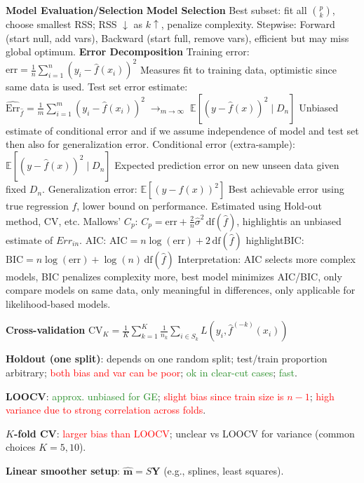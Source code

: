 \documentclass[9pt]{article}
\renewcommand\small{\footnotesize}
\newcommand{\toptopic}[1]{\textbf{{#1}}}
\newcommand{\highlight}[1]{\small{\textcolor{Sepia}{#1}}}
\newcommand{\topic}[1]{\small{\textbf{\textcolor{Sepia}{#1}}}}
\begin{document}
\begin{multicols*}{3}
\toptopic{Model Evaluation/Selection}
\topic{Model Selection} Best subset: fit all $\binom{p}{k}$, choose smallest RSS; RSS $\downarrow$ as $k \uparrow$, penalize complexity. Stepwise: Forward (start null, add vars), Backward (start full, remove vars), efficient but may miss global optimum. 
\topic{Error Decomposition}
\highlight{Training error}: $\text{err} = \tfrac{1}{n}\sum_{i=1}^n (y_i - \hat f(x_i))^2$  
Measures fit to training data, optimistic since same data is used.
\highlight{Test set error estimate}: $\hat{\text{Err}}_{\hat f} = \tfrac{1}{m}\sum_{i=1}^m (y_i - \hat f(x_i))^2 \;\to_{m\to\infty}\; \mathbb{E}[(y-\hat f(x))^2 \mid D_n]$ Unbiased estimate of conditional error and if we assume independence of model and test set then also for generalization error.
\highlight{Conditional error (extra-sample)}: $\mathbb{E}[(y-\hat f(x))^2 \mid D_n]$  
Expected prediction error on new unseen data given fixed $D_n$.
\highlight{Generalization error}: $\mathbb{E}[(y-f(x))^2]$ Best achievable error using true regression $f$, lower bound on performance. Estimated using Hold-out method, CV, etc.
\highlight{Mallows’ $C_p$}: $C_p = \text{err} + \tfrac{2}{n}\hat\sigma^2 \,\text{df}(\hat f)$, highlight{is an unbiased estimate of $Err_{in}$}.
\highlight{AIC:} $\text{AIC} = n \log(\text{err}) + 2 \,\text{df}(\hat f)$
highlight{BIC}: $\text{BIC} = n \log(\text{err}) + \log(n)\,\text{df}(\hat f)$
Interpretation: AIC selects more complex models, BIC penalizes complexity more, best model minimizes AIC/BIC, only compare models on same data, only meaningful in differences, only applicable for likelihood-based models.


\toptopic{Cross-validation}
CV$_K = \frac{1}{K}\sum_{k=1}^K \frac{1}{n_k} \sum_{i \in S_k} L(y_i, \hat{f}^{(-k)}(x_i))$


\topic{Holdout (one split)}: depends on one random split; test/train proportion arbitrary; \textcolor{red}{both bias and var can be poor}; \textcolor{ForestGreen}{ok in clear-cut cases}; \textcolor{ForestGreen}{fast}.

\topic{LOOCV}: \textcolor{ForestGreen}{approx. unbiased for GE}; \textcolor{red}{slight bias since train size is $n-1$}; \textcolor{red}{high variance due to strong correlation across folds}.

\topic{$K$-fold CV}: \textcolor{red}{larger bias than LOOCV}; unclear vs LOOCV for variance (common choices $K=5,10$).

\topic{Linear smoother setup}: $\hat{\boldsymbol m} = S \boldsymbol Y$ (e.g., splines, least squares).


\end{multicols*}
\end{document}

